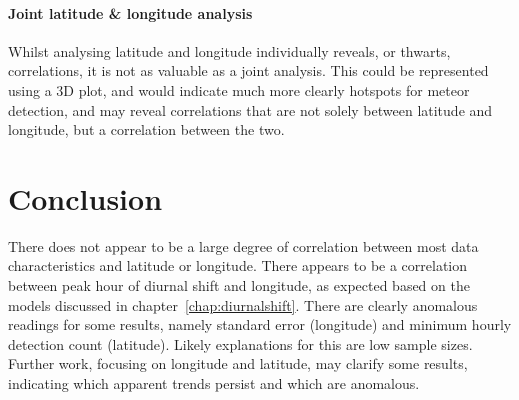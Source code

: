\paragraph{Joint latitude \& longitude analysis\\}
Whilst analysing latitude and longitude individually reveals, or thwarts, correlations, it is not as valuable as a joint analysis. This could be represented using a 3D plot, and would indicate much more clearly hotspots for meteor detection, and may reveal correlations that are not solely between latitude and longitude, but a correlation between the two.

\section{Conclusion}
There does not appear to be a large degree of correlation between most data characteristics and latitude or longitude. There appears to be a correlation between peak hour of diurnal shift and longitude, as expected based on the models discussed in chapter~\ref{chap:diurnalshift}. There are clearly anomalous readings for some results, namely standard error (longitude) and minimum hourly detection count (latitude). Likely explanations for this are low sample sizes. Further work, focusing on longitude and latitude, may clarify some results, indicating which apparent trends persist and which are anomalous.